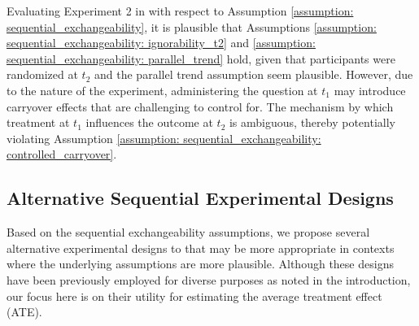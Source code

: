 Evaluating Experiment 2 in \cite{09_Clifford} with respect to Assumption \ref{assumption: sequential_exchangeability}, it is plausible that Assumptions \ref{assumption: sequential_exchangeability: ignorability_t2} and \ref{assumption: sequential_exchangeability: parallel_trend} hold, given that participants were randomized at $t_2$ and the parallel trend assumption seem plausible. However, due to the nature of the experiment, administering the question at $t_1$ may introduce carryover effects that are challenging to control for. The mechanism by which treatment at $t_1$ influences the outcome at $t_2$ is ambiguous, thereby potentially violating Assumption \ref{assumption: sequential_exchangeability: controlled_carryover}.

\subsection{Alternative Sequential Experimental Designs}
\label{section: alternative_designs}

Based on the sequential exchangeability assumptions, we propose several alternative experimental designs to \cwsd{} that may be more appropriate in contexts where the underlying assumptions are more plausible. Although these designs have been previously employed for diverse purposes as noted in the introduction, our focus here is on their utility for estimating the average treatment effect (ATE).

